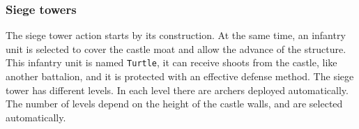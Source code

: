 \documentclass[tog]{acmsiggraph}
\begin{document}
\subsubsection{Siege towers}
\label{sec:settingssiegetowers}

The siege tower action starts by its construction. 
At the same time, an infantry unit is selected to cover the castle moat and allow the advance of the structure.
This infantry unit is named \texttt{Turtle}, it can receive shoots from the castle, like another battalion, and it is protected with an effective defense method.
The siege tower has different levels. 
In each level there are archers deployed automatically. 
The number of levels depend on the height of the castle walls, and are selected automatically.
\end{document}

